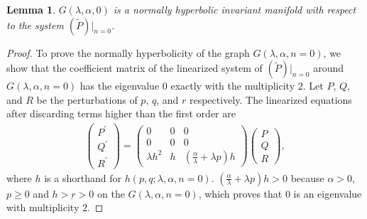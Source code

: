 \documentclass[a4paper,11pt]{article}
\newtheorem{lemma}{Lemma}[section]
\begin{document}
\begin{lemma} \label{lem:normal_hyper}
 $G(\lambda,\alpha,0)$ is a normally hyperbolic invariant manifold with respect to the system $(\tilde{P})|_{n=0}$.
\end{lemma}
\begin{proof}
To prove the normally hyperbolicity of the graph $G(\lambda,\alpha,n=0)$, we show that the coefficient matrix of the linearized system of $(\tilde{P})|_{n=0}$ around $G(\lambda,\alpha,n=0)$ has the eigenvalue $0$ exactly with the multiplicity $2$. Let $P$, $Q$, and $R$ be the perturbations of $p$, $q$, and $r$ respectively. The linearized equations after discarding terms higher than the first order are
\begin{align*}
 \begin{pmatrix} {P}^\prime\\ {Q}^\prime \\ {R}^\prime \end{pmatrix} =
 \begin{pmatrix} 0 & 0& 0\\ 0 & 0 & 0\\ \lambda h^2 & h & ( \frac{\alpha}{ \lambda} + \lambda p )h \end{pmatrix} \begin{pmatrix} {P}\\ {Q} \\ {R} \end{pmatrix},
\end{align*}
where $h$ is a shorthand for $h(p,q;\lambda,\alpha,n=0)$. $( \frac{\alpha}{ \lambda} + \lambda p )h > 0$ because $\alpha>0$, $p\ge0$ and $h > \underbar{r}>0$ on the $G(\lambda,\alpha,n=0)$, which proves that $0$ is an eigenvalue with multiplicity $2$.
\end{proof}
\end{document}
